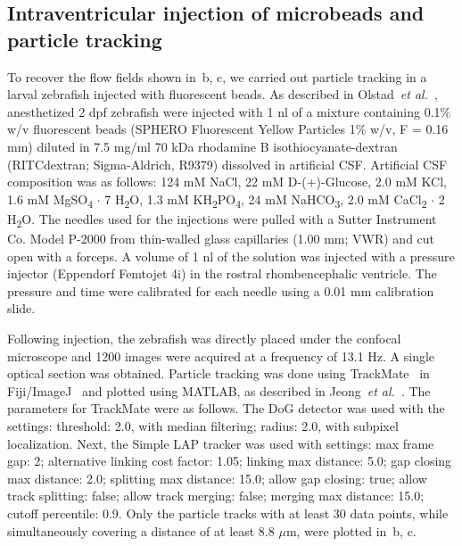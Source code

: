 \documentclass[fleqn]{wlscirep}
\begin{document}
\subsection*{Intraventricular injection of microbeads and particle tracking}
To recover the flow fields shown in~b, c, we carried out
particle tracking in a larval zebrafish injected with fluorescent beads.
As described in Olstad~\emph{et al.}~\cite{Olstad2019CiliaryDevelopment},
anesthetized 2 dpf zebrafish were injected with 1 nl of a mixture containing 0.1\% w/v fluorescent beads
(SPHERO Fluorescent Yellow Particles 1\% w/v, F = 0.16 mm) diluted
in 7.5 mg/ml 70 kDa rhodamine B isothiocyanate-dextran (RITCdextran; Sigma-Aldrich, R9379)
dissolved in artificial CSF. Artificial CSF composition was as follows:
124 mM NaCl, 22 mM D-(+)-Glucose, 2.0 mM KCl, 1.6 mM MgSO\textsubscript{4} $\cdot$ 7 H\textsubscript{2}O,
1.3 mM KH\textsubscript{2}PO\textsubscript{4}, 24 mM NaHCO\textsubscript{3},
2.0 mM CaCl\textsubscript{2} $\cdot$ 2 H\textsubscript{2}O.
The needles used for the injections were pulled with a
Sutter Instrument Co. Model P-2000 from thin-walled glass
capillaries (1.00 mm; VWR) and cut open with a forceps.
A volume of 1 nl of the solution was injected with a pressure injector
(Eppendorf Femtojet 4i) in the rostral rhombencephalic ventricle.
The pressure and time were calibrated for each needle using a 0.01 mm calibration slide.

Following injection, the zebrafish was directly placed under the confocal
microscope and 1200 images were acquired at a frequency of 13.1 Hz.
A single optical section was obtained. Particle tracking was done using
TrackMate~\cite{Tinevez2017TrackMate:Tracking} in Fiji/ImageJ~\cite{Schindelin2012Fiji:Analysis}
and plotted using MATLAB, as described in Jeong~\emph{et al.}~\cite{Jeong2022MeasurementTelencephalon}.
The parameters for TrackMate were as follows.
The DoG detector was used with the settings: threshold: 2.0, with
median filtering; radius: 2.0, with subpixel localization.
Next, the Simple LAP tracker was used with settings: max frame gap: 2;
alternative linking cost factor: 1.05; linking max distance: 5.0; gap closing max distance: 2.0;
splitting max distance: 15.0; allow gap closing: true; allow track splitting:
false; allow track merging: false; merging max distance: 15.0; cutoff percentile: 0.9.
Only the particle tracks with at least 30 data points, while simultaneously
covering a distance of at least 8.8 $\mu$m, were plotted in~b, c.

\end{document}

